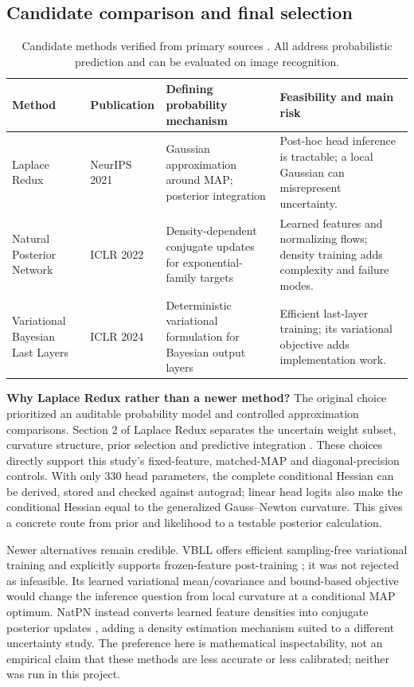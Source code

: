 \documentclass[10pt,a4paper]{article}
\begin{document}
\subsection{Candidate comparison and final selection}

\begin{table}[H]\centering\small
\begin{tabularx}{\linewidth}{>{\raggedright\arraybackslash}p{25mm}>{\raggedright\arraybackslash}p{20mm}>{\raggedright\arraybackslash}X>{\raggedright\arraybackslash}X}
\toprule Method & Publication & Defining probability mechanism & Feasibility and main risk\\
\midrule
Laplace Redux & NeurIPS 2021 & Gaussian approximation around MAP; posterior integration &
Post-hoc head inference is tractable; a local Gaussian can misrepresent uncertainty.\\
Natural Posterior Network & ICLR 2022 & Density-dependent conjugate updates for exponential-family targets &
Learned features and normalizing flows; density training adds complexity and failure modes.\\
Variational Bayesian Last Layers & ICLR 2024 & Deterministic variational formulation for Bayesian output layers &
Efficient last-layer training; its variational objective adds implementation work.\\
\bottomrule
\end{tabularx}
\caption{Candidate methods verified from primary sources \cite{laplace,natpn,vbll}.
All address probabilistic prediction and can be evaluated on image recognition.}
\end{table}
\textbf{Why Laplace Redux rather than a newer method?}
The original choice prioritized an auditable probability model and controlled
approximation comparisons. Section 2 of Laplace Redux separates the uncertain
weight subset, curvature structure, prior selection and predictive integration
\cite{laplace}. These choices directly support this study's fixed-feature,
matched-MAP and diagonal-precision controls. With only 330 head parameters,
the complete conditional Hessian can be derived, stored and checked against
autograd; linear head logits also make the conditional Hessian equal to the
generalized Gauss--Newton curvature. This gives a concrete route from prior and
likelihood to a testable posterior calculation.

Newer alternatives remain credible. VBLL offers efficient sampling-free
variational training and explicitly supports frozen-feature post-training
\cite{vbll}; it was not rejected as infeasible. Its learned variational
mean/covariance and bound-based objective would change the inference question
from local curvature at a conditional MAP optimum. NatPN instead converts learned
feature densities into conjugate posterior updates \cite{natpn}, adding a density
estimation mechanism suited to a different uncertainty study. The preference
here is mathematical inspectability, not an empirical claim that these methods
are less accurate or less calibrated; neither was run in this project.
\end{document}
